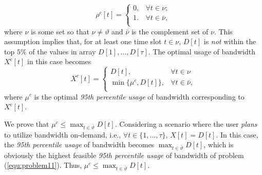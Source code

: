 \documentclass[10pt,journal,compsoc]{IEEEtran}
\begin{document}
\begin{equation}\label{formula:rhoc}
\rho^c[t]=
\begin{cases}
0,  &\forall t \in \nu; \\
1. &\forall t \in \bar{\nu},\\
\end{cases}
\end{equation}
where $\nu$ is some set so that $\nu\neq\vartheta$ and  $\bar{\nu}$ is the complement set  of $\nu$. This assumption implies that, for at least one time slot $t \in \nu$, $D[t]$ is \emph{not} within the top $5\%$ of the values in array $D[1],\ldots,D[\tau]$. The optimal  usage of bandwidth $X^{c}[t]$ in this case becomes
\begin{equation}\label{equ:scenario1}
X^{c}[t]=
\begin{cases}
D[t], &\forall t \in  \nu \\
\min\{\mu^{c},D[t]\}, &\forall t \in \bar{\nu},\\
\end{cases}
\end{equation}
where $\mu^{c}$ is the optimal \emph{95th percentile usage} of bandwidth corresponding to $X^{c}[t]$.

\noindent
We prove that $\mu^{c} \leq \max_{t \in \bar{\vartheta}}D[t]$. Considering a scenario where the user \emph{plans} to utilize bandwidth on-demand, i.e., $\forall t \in \{1,\ldots,\tau\}$, $X[t]=D[t]$. In this case, the \emph{95th percentile usage} of bandwidth becomes $\max_{t \in \bar{\vartheta}}D[t]$, which is obviously the highest feasible \emph{95th percentile usage} of bandwidth of problem (\ref{equ:problem11}). Thus, $\mu^{c} \leq \max_{t \in \bar{\vartheta}}D[t]$.
\end{document}

